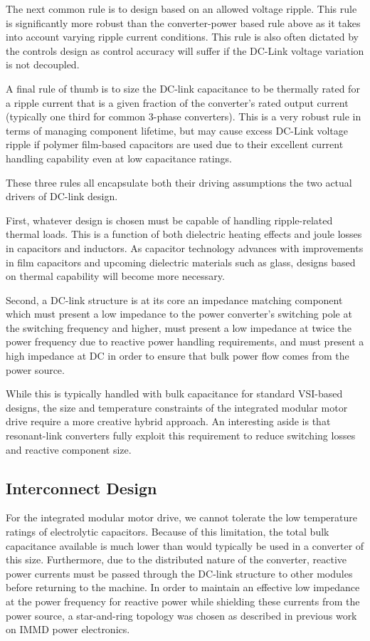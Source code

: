 The next common rule is to design based on an allowed voltage ripple.
This rule is significantly more robust than the converter-power based rule
above as it takes into account varying ripple current conditions.
This rule is also often dictated by the controls design as control accuracy
will suffer if the DC-Link voltage variation is not decoupled.

A final rule of thumb is to size the DC-link capacitance to be thermally rated
for a ripple current that is a given fraction of the converter's rated output
current (typically one third for common 3-phase converters).
This is a very robust rule in terms of managing component lifetime, but may
cause excess DC-Link voltage ripple if polymer film-based capacitors are used
due to their excellent current handling capability even at low capacitance
ratings.

These three rules all encapsulate both their driving assumptions the two
actual drivers of DC-link design.

First, whatever design is chosen must be capable of handling ripple-related
thermal loads.
This is a function of both dielectric heating effects and joule
losses in capacitors and inductors.
As capacitor technology advances with
improvements in film capacitors and upcoming dielectric materials such as
glass, designs based on thermal capability will become more necessary.

Second, a DC-link structure is at its core an impedance matching component
which must present a low impedance to the power converter's switching pole
at the switching frequency and higher, must present a low impedance at twice
the power frequency due to reactive power handling requirements, and must
present a high impedance at DC in order to ensure that bulk power flow comes
from the power source.

While this is typically handled with bulk capacitance for standard VSI-based
designs, the size and temperature constraints of the integrated modular motor
drive require a more creative hybrid approach.
An interesting aside is that resonant-link converters fully exploit this
requirement to reduce switching losses and reactive component size.

\subsection{Interconnect Design}
For the integrated modular motor drive, we cannot tolerate the low temperature
ratings of electrolytic capacitors.
Because of this limitation, the total bulk capacitance available is much lower
than would typically be used in a converter of this size.
Furthermore, due to the distributed nature of the converter, reactive power
currents must be passed through the DC-link structure to other modules before
returning to the machine.
In order to maintain an effective low impedance at the power frequency for
reactive power while shielding these currents from the power source, a
star-and-ring topology was chosen as described in previous work on IMMD power
electronics.


